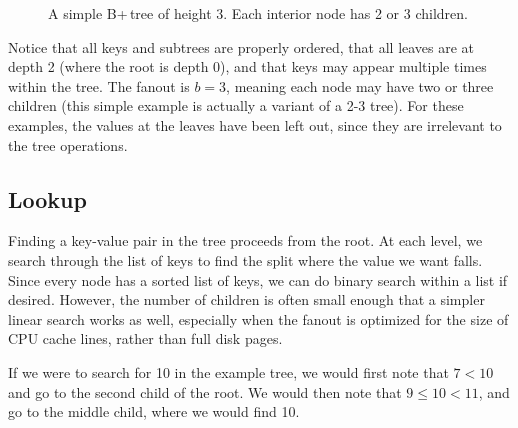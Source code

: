 \documentclass[12pt]{article}
\begin{document}
\begin{figure}[ht]
    \centering
    \caption{A simple B+\,tree of height 3. Each interior node has 2 or 3 children.}
    \label{fig:demotree1}
\end{figure}

Notice that all keys and subtrees are properly ordered, that all leaves are at depth 2 (where the root is depth 0), and that keys may appear multiple times within the tree. The fanout is $b=3$, meaning each node may have two or three children (this simple example is actually a variant of a 2-3 tree). For these examples, the values at the leaves have been left out, since they are irrelevant to the tree operations.

\subsection{Lookup}
\label{subsec:lookup}

Finding a key-value pair in the tree proceeds from the root. At each level, we search through the list of keys to find the split where the value we want falls. Since every node has a sorted list of keys, we can do binary search within a list if desired. However, the number of children is often small enough that a simpler linear search works as well, especially when the fanout is optimized for the size of CPU cache lines, rather than full disk pages.

If we were to search for 10 in the example tree, we would first note that $7 < 10$ and go to the second child of the root. We would then note that $9 \leq 10 < 11$, and go to the middle child, where we would find 10.
\end{document}
